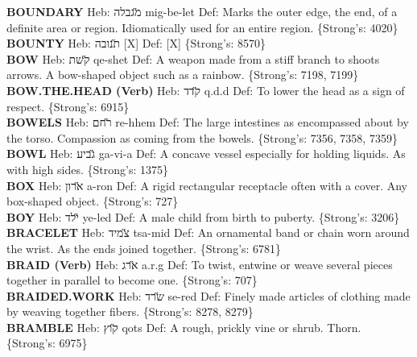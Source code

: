 {\textbf{BOUNDARY} Heb: {\large\H מגבלה} mig-be-let Def: Marks the outer edge, the end, of a definite area or region. Idiomatically used for an entire region. \{Strong's: 4020\}\hfill{}\\

\textbf{BOUNTY} Heb: {\large\H תנובה} {[}X{]} Def: {[}X{]} \{Strong's: 8570\}\hfill{}\\

\textbf{BOW} Heb: {\large\H קשת} qe-shet Def: A weapon made from a stiff branch to shoots arrows. A bow-shaped object such as a rainbow. \{Strong's: 7198, 7199\}\hfill{}\\

\textbf{BOW.THE.HEAD (Verb)} Heb: {\large\H קדד} q.d.d Def: To lower the head as a sign of respect. \{Strong's: 6915\}\hfill{}\\

\textbf{BOWELS} Heb: {\large\H רחם} re-hhem Def: The large intestines as encompassed about by the torso. Compassion as coming from the bowels. \{Strong's: 7356, 7358, 7359\}\hfill{}\\

\textbf{BOWL} Heb: {\large\H גביע} ga-vi-a Def: A concave vessel especially for holding liquids. As with high sides. \{Strong's: 1375\}\hfill{}\\

\textbf{BOX} Heb: {\large\H ארון} a-ron Def: A rigid rectangular receptacle often with a cover. Any box-shaped object. \{Strong's: 727\}\hfill{}\\

\textbf{BOY} Heb: {\large\H ילד} ye-led Def: A male child from birth to puberty. \{Strong's: 3206\}\hfill{}\\

\textbf{BRACELET} Heb: {\large\H צמיד} tsa-mid Def: An ornamental band or chain worn around the wrist. As the ends joined together. \{Strong's: 6781\}\hfill{}\\

\textbf{BRAID (Verb)} Heb: {\large\H ארג} a.r.g Def: To twist, entwine or weave several pieces together in parallel to become one. \{Strong's: 707\}\hfill{}\\

\textbf{BRAIDED.WORK} Heb: {\large\H שרד} se-red Def: Finely made articles of clothing made by weaving together fibers. \{Strong's: 8278, 8279\}\hfill{}\\

\textbf{BRAMBLE} Heb: {\large\H קוץ} qots Def: A rough, prickly vine or shrub. Thorn. \{Strong's: 6975\}\hfill{}\\

}
